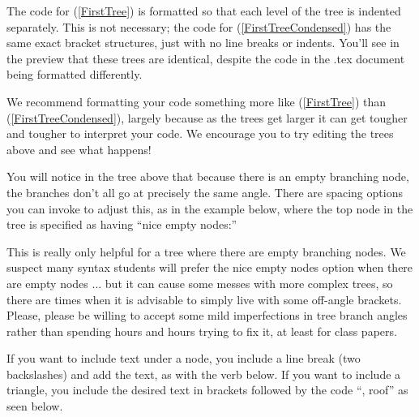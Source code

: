 \documentclass{article}
\begin{document}
\ea \label{FirstTree}
\z 

\noindent The code for (\ref{FirstTree}) is formatted so that each level of the tree is indented separately. This is not necessary; the code for (\ref{FirstTreeCondensed}) has the same exact bracket structures, just with no line breaks or indents. You'll see in the preview that these trees are identical, despite the code in the .tex document being formatted differently.

\ea \label{FirstTreeCondensed}
\z 

\noindent We recommend formatting your code something more like (\ref{FirstTree}) than (\ref{FirstTreeCondensed}), largely because as the trees get larger it can get tougher and tougher to interpret your code. We encourage you to try editing the trees above and see what happens! 


You will notice in the tree above that because there is an empty branching node, the branches don't all go at precisely the same angle. There are spacing options you can invoke to adjust this, as in the example below, where the top node in the tree is specified as having ``nice empty nodes:'' 

\ea 
{}
\z 

\noindent This is really only helpful for a tree where there are empty branching nodes. We suspect many syntax students will prefer the nice empty nodes option when there are empty nodes ... but it can cause some messes with more complex trees, so there are times when it is advisable to simply live with some off-angle brackets. Please, please be willing to accept some mild imperfections in tree branch angles rather than spending hours and hours trying to fix it, at least for class papers. %

\noindent If you want to include text under a node, you include a line break (two backslashes) and add the text, as with the verb below. If you want to include a triangle, you include the desired text in brackets followed by the code ``, roof'' as seen below.

\ea \label{FullVpTree}
\z 
\end{document}
